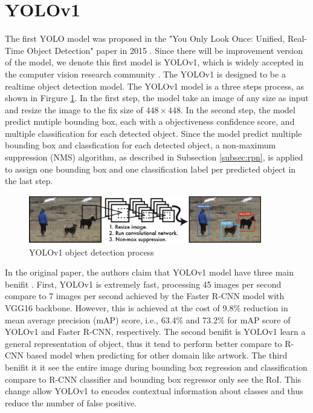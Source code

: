 \section{YOLOv1}  \label{sec:yolov1}

The first YOLO model was proposed in the "You Only Look Once: Uniﬁed, Real-Time Object Detection" paper in 2015 \cite{yolov1_2016}. Since there will be improvement version of the model, we denote this first model is YOLOv1, which is widely accepted in the computer vision research community \cite{understand_cnn_vs_yolo}. The YOLOv1 is designed to be a realtime object detection model. The YOLOv1 model is a three steps process, as shown in Firgure \ref{fig:yolov1_process}. In the first step, the model take an image of any size as input and resize the image to the fix size of $448 \times 448$. In the second step, the model predict mutiple bounding box, each with a objectiveness confidence score, and multiple classification for each detected object. Since the model predict multiple bounding box and classfication for each detected object, a non-maximum suppression (NMS) algorithm, as described in Subsection \ref{subsec:rpn}, is applied to assign one bounding box and one classification label per predicted object in the last step.

\begin{figure}[!ht]
    \centering
    \includegraphics[width=4in]{figures/yolov1_process.png}
    \caption{YOLOv1 object detection process \cite{yolov1_2016}} 
    \label{fig:yolov1_process}
\end{figure}

In the original paper, the authors claim that YOLOv1 model have three main benifit \cite{yolov1_2016}. First, YOLOv1 is extremely fast, processing 45 images per second compare to 7 images per second achieved by the Faster R-CNN model with VGG16 backbone. However, this is achieved at the cost of 9.8\% reduction in mean average precision (mAP) score, i.e., 63.4\% and 73.2\% for mAP score of YOLOv1 and Faster R-CNN, respectively. The second benifit is YOLOv1 learn a general representation of object, thus it tend to perform better compare to R-CNN based model when predicting for other domain like artwork. The third benifit it it see the entire image during bounding box regression and classification compare to R-CNN classifier and bounding box regressor only see the RoI. This change allow YOLOv1 to encodes contextual information about classes and thus reduce the number of false positive.

